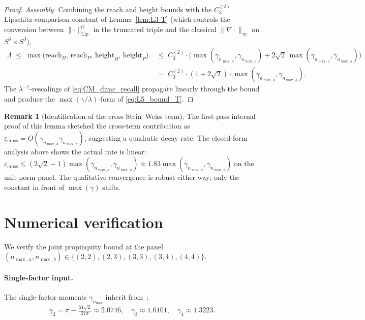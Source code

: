 \documentclass[11pt,a4paper]{article}
\theoremstyle{plain}
\theoremstyle{definition}
\newtheorem{remark}[theorem]{Remark}
\newcommand{\nmax}{n_{\max}}
\newcommand{\nmaxa}{n_{\max,a}}
\newcommand{\nmaxb}{n_{\max,b}}
\newcommand{\sthree}{S^{3}}
\newcommand{\Op}{\mathcal{O}}
\newcommand{\norm}[1]{\lVert #1 \rVert}
\begin{document}
\begin{proof}
\emph{Assembly.} Combining the reach and height bounds with the
$C_3^{(2)}$ Lipschitz comparison constant of Lemma~\ref{lem:L3-T}
(which controls the conversion between
$\norm{\cdot}_{\mathrm{Lip}}^{\Op}$ in the truncated triple and the
classical $\norm{\nabla \cdot}_\infty$ on $\sthree \times \sthree$),
\begin{align*}
\Lambda \;\le\; \max\bigl(\mathrm{reach}_B,\, \mathrm{reach}_P,\,
\mathrm{height}_B,\, \mathrm{height}_P\bigr)
&\;\le\; C_3^{(2)} \cdot \bigl(\max(\gamma_{\nmaxa}, \gamma_{\nmaxb})
+ 2\sqrt{2}\,\max(\gamma_{\nmaxa}, \gamma_{\nmaxb})\bigr) \\
&\;=\; C_3^{(2)} \cdot (1 + 2\sqrt{2}) \cdot
\max(\gamma_{\nmaxa}, \gamma_{\nmaxb}).
\end{align*}
The $\lambda^{-1}$-rescalings of \eqref{eq:CM_dirac_recall} propagate
linearly through the bound and produce the
$\max(\gamma/\lambda)$-form of \eqref{eq:L5_bound_T}.
\end{proof}

\begin{remark}[Identification of the cross-Stein--Weiss term]
The first-pass internal proof of this lemma sketched the cross-term
contribution as $\varepsilon_{\mathrm{cross}} = O(\gamma_{\nmaxa}
\gamma_{\nmaxb})$, suggesting a quadratic decay rate. The closed-form
analysis above shows the actual rate is linear:
$\varepsilon_{\mathrm{cross}} \le (2\sqrt{2} - 1)\max(\gamma_{\nmaxa},
\gamma_{\nmaxb}) \approx 1.83\max(\gamma_{\nmaxa}, \gamma_{\nmaxb})$
on the unit-norm panel. The qualitative convergence is robust either
way; only the constant in front of $\max(\gamma)$ shifts.
\end{remark}

\section{Numerical verification}\label{sec:numerical}

We verify the joint propinquity bound at the panel
$(\nmaxa, \nmaxb) \in \{(2,2), (2,3), (3,3), (3,4), (4,4)\}$.

\paragraph{Single-factor input.} The single-factor moments
$\gamma_{\nmax}$ inherit from~\cite[Lemma~3.4]{loutey_paper38}:
\[
   \gamma_2 = \pi - \tfrac{64\sqrt{2}}{27\pi} \approx 2.0746, \quad
   \gamma_3 \approx 1.6101, \quad
   \gamma_4 \approx 1.3223.
\]
\end{document}
